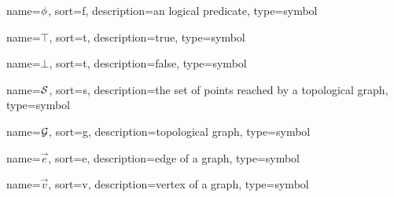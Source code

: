 	{%
		name=\ensuremath{\func{\phi}},
		sort=f,
		description=an logical predicate,
		type=symbol
	}
	\newcommand{\logicalpredicate}{\gls{sym:logicalpredicate}}

	{%
		name=\ensuremath{\top},
		sort=t,
		description=true,
		type=symbol
	}
	\newcommand{\true}{\gls{sym:true}}

	{%
		name=\ensuremath{\bot},
		sort=t,
		description=false,
		type=symbol
	}
	\newcommand{\false}{\gls{sym:false}}

	{%
		name=\ensuremath{\set{S}},
		sort=s,
		description=the set of points reached by a topological graph,
		type=symbol
	}
	\newcommand{\swath}{\gls{sym:swath}}

	{%
		name=\ensuremath{\set{G}},
		sort=g,
		description=topological graph,
		type=symbol
	}
	\newcommand{\topologicalgraph}{\gls{sym:topologicalgraph}}

	{%
		name=\ensuremath{\vec{e}},
		sort=e,
		description=edge of a graph,
		type=symbol
	}
	\newcommand{\edge}{\gls{sym:edge}}

	{%
		name=\ensuremath{\vec{v}},
		sort=v,
		description=vertex of a graph,
		type=symbol
	}
	\newcommand{\vertex}{\gls{sym:vertex}}

